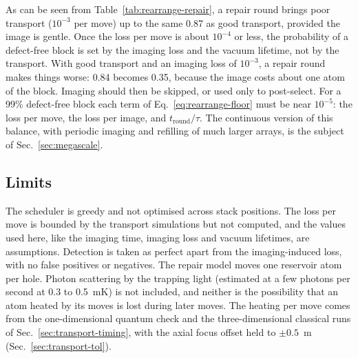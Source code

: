 As can be seen from Table~\ref{tab:rearrange-repair}, a repair round brings poor transport ($10^{-3}$ per move) up to the same 0.87 as good transport, provided the image is gentle. Once the loss per move is about $10^{-4}$ or less, the probability of a defect-free block is set by the imaging loss and the vacuum lifetime, not by the transport. With good transport and an imaging loss of $10^{-3}$, a repair round makes things worse: 0.84 becomes 0.35, because the image costs about one atom of the block. Imaging should then be skipped, or used only to post-select. For a 99\% defect-free block each term of Eq.~\eqref{eq:rearrange-floor} must be near $10^{-5}$: the loss per move, the loss per image, and $t_\mathrm{round}/\tau$. The continuous version of this balance, with periodic imaging and refilling of much larger arrays, is the subject of Sec.~\ref{sec:megascale}.

\subsection{Limits}\label{sec:rearrange-limits}

The scheduler is greedy and not optimised across stack positions. The loss per move is bounded by the transport simulations but not computed, and the values used here, like the imaging time, imaging loss and vacuum lifetimes, are assumptions. Detection is taken as perfect apart from the imaging-induced loss, with no false positives or negatives. The repair model moves one reservoir atom per hole. Photon scattering by the trapping light (estimated at a few photons per second at 0.3 to 0.5~mK) is not included, and neither is the possibility that an atom heated by its moves is lost during later moves. The heating per move comes from the one-dimensional quantum check and the three-dimensional classical runs of Sec.~\ref{sec:transport-timing}, with the axial focus offset held to $\pm0.5$~\textmu m (Sec.~\ref{sec:transport-tol}).
